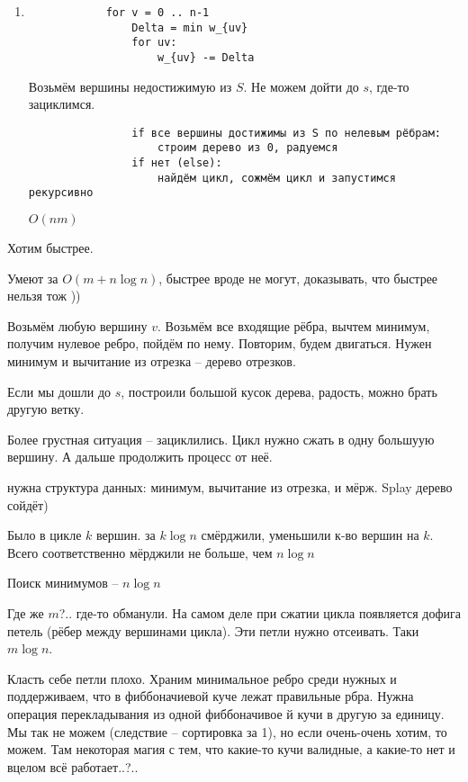 \documentclass{book}
\theoremstyle{definition}
\begin{document}
\begin{enumerate}
    \item 
        \begin{lstlisting}
            for v = 0 .. n-1
                Delta = min w_{uv}
                for uv:
                    w_{uv} -= Delta
        \end{lstlisting}

        Возьмём вершины недостижимую из $S$. Не можем дойти до  $s$, где-то зациклимся.
         \begin{lstlisting}
                if все вершины достижимы из S по нелевым рёбрам:
                    строим дерево из 0, радуемся
                if нет (else):
                    найдём цикл, сожмём цикл и запустимся рекурсивно
        \end{lstlisting}    

        $O\left( nm \right) $
\end{enumerate}

Хотим быстрее.

Умеют за $O\left( m + n\log n \right) $, быстрее вроде не могут, доказывать, что быстрее нельзя тож ))

\begin{statement}

    Возьмём любую вершину  $v$. Возьмём все входящие рёбра, вычтем минимум, получим нулевое ребро, пойдём по нему. Повторим, будем двигаться. Нужен минимум и вычитание из отрезка -- дерево отрезков.

    Если мы дошли до  $s$, построили большой кусок дерева, радость, можно брать другую ветку.

    Более грустная ситуация -- зациклились. Цикл нужно сжать в одну большуую вершину. А дальше продолжить процесс от неё.

    нужна структура данных: минимум, вычитание из отрезка, и мёрж. Splay дерево сойдёт)

    Было в цикле $k$ вершин. за  $k\log n$ смёрджили, уменьшили к-во вершин на $k$. Всего соответственно мёрджили не больше, чем  $n\log n$

    Поиск минимумов -- $n\log n$

    Где же $m$?.. где-то обманули. На самом деле при сжатии цикла появляется дофига петель (рёбер между вершинами цикла). Эти петли нужно отсеивать. Таки  $m\log n$.

    Класть себе петли плохо. Храним минимальное ребро среди нужных и поддерживаем, что в фиббоначиевой куче лежат правильные рбра. Нужна операция перекладывания из одной фиббоначивое й кучи в другую за единицу. Мы так не можем (следствие -- сортировка за 1), но если очень-очень хотим, то можем. Там некоторая магия с тем, что какие-то кучи валидные, а какие-то нет и вцелом всё работает..?..
\end{statement}
\end{document}
